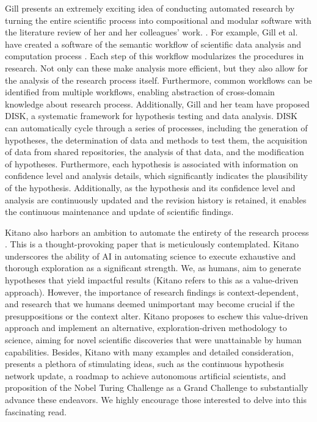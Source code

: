 \documentclass{book}
\begin{document}
Gill presents an extremely exciting idea of conducting automated research by turning the entire scientific process into compositional and modular software with the literature review of her and her colleagues' work. \cite{gil2022will}. For example, Gill et al. have created a software of the semantic workflow of scientific data analysis and computation process  \cite{gil2011semantic}. 
Each step of this workflow modularizes the procedures in research. Not only can these make analysis more efficient, but they also allow for the analysis of the research process itself. Furthermore, common workflows can be identified from multiple workflows, enabling abstraction of cross-domain knowledge about research process. Additionally, Gill and her team have proposed DISK, a systematic framework for hypothesis testing and data analysis. DISK can automatically cycle through a series of processes, including the generation of hypotheses, the determination of data and methods to test them, the acquisition of data from shared repositories, the analysis of that data, and the modification of hypotheses. Furthermore, each hypothesis is associated with information on confidence level and analysis details, which significantly indicates the plausibility of the hypothesis. Additionally, as the hypothesis and its confidence level and analysis are continuously updated and the revision history is retained, it enables the continuous maintenance and update of scientific findings.

Kitano also harbors an ambition to automate the entirety of the research process \cite{kitano2021nobel}. This is a thought-provoking paper that is meticulously contemplated. Kitano underscores the ability of AI in automating science to execute exhaustive and thorough exploration as a significant strength. We, as humans, aim to generate hypotheses that yield impactful results (Kitano refers to this as a value-driven approach). However, the importance of research findings is context-dependent, and research that we humans deemed unimportant may become crucial if the presuppositions or the context alter. Kitano proposes to eschew this value-driven approach and implement an alternative, exploration-driven methodology to science, aiming for novel scientific discoveries that were unattainable by human capabilities. Besides, Kitano with many examples and detailed consideration, presents a plethora of stimulating ideas, such as the continuous hypothesis network update, a roadmap to achieve autonomous artificial scientists, and proposition of the Nobel Turing Challenge as a Grand Challenge to substantially advance these endeavors. We highly encourage those interested to delve into this fascinating read.
\end{document}
